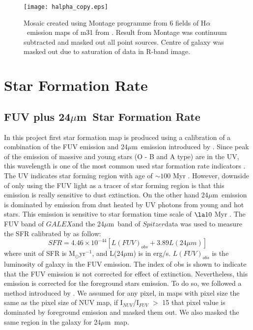 \documentclass[useAMS,usenatbib]{mn2e}
\newcommand \halpha    {H$\alpha $\ }
\newcommand \um    {$\mu$m\ }
\newcommand \Spitzer {$Spitzer$}
\newcommand \Galex {$GALEX$}
\begin{document}
\begin{figure*}
 {\vfil  \texttt{[image: halpha\_copy.eps]}
  \caption{Mosaic created using Montage programme from 6 fields of \halpha emission maps of m31 from . Result from Montage was continuum subtracted and masked out all point sources. Centre of galaxy was masked out due to saturation of data in R-band image.\label{fig:halpha}}
 \vfil}
\end{figure*}


\section{Star Formation Rate}
\subsection{FUV plus 24\um Star Formation Rate}

In this project first star formation map is produced using a calibration of a combination of the FUV emission and 24\um emission introduced by \cite{Hao11}. Since peak of the emission of massive and young stars (O - B and A type) are in the UV, this wavelength is one of the most common used star formation rate indicators \citep[e.g.,][]{Kennicutt89}. The UV indicates star forming region with age of $\sim 100$ Myr \citep[e.g.,][]{Kennicutt98, Calzetti05}. However, downside of only using the FUV light as a tracer of star forming region is that this emission is really sensitive to dust extinction. On the other hand 24\um emission is dominated by emission from dust heated by UV photons from young and hot stars. This emission is sensitive to star formation time scale of $\la10$ Myr \citep{Calzetti07}.
The FUV band of \Galex and the 24\um band of \Spitzer data was used to measure the SFR calibrated by \cite{Hao11} as follow:
\begin{equation}
\label{equ: fuvplus24}
SFR =4.46\times10^{-44}[L(FUV)_{obs}+3.89L(24\mu m)]
\end{equation}
where unit of SFR is M$_{\odot}$yr$^{-1}$, and L(24$\mu$m) is in erg/s. $L(FUV)_{obs}$ is the luminosity of galaxy in the FUV emission. The index of obs is shown to indicate that the FUV emission is not corrected for effect of extinction. Nevertheless, this emission is corrected for the foreground stars emission. To do so, we followed a method introduced by \cite{Leroy08}. We assumed for any pixel, in maps with pixel size the same as the pixel size of NUV map, if I$_{NUV}$/I$_{FUV}$ $>$ 15 that pixel value is dominated by foreground emission and masked them out. We also masked the same region in the galaxy for 24\um map.
\end{document}
